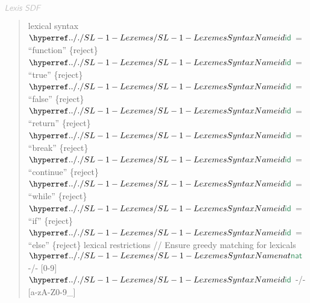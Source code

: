 $\KEY{Lexis SDF}$

\begin{quote}
lexical syntax\newline
   $\SHADE{\SYNHYPER{../.}{SL-1-Lexemes}{id}}$ = {}``function{}'' \{reject\}\newline
   $\SHADE{\SYNHYPER{../.}{SL-1-Lexemes}{id}}$ = {}``true{}''     \{reject\}\newline
   $\SHADE{\SYNHYPER{../.}{SL-1-Lexemes}{id}}$ = {}``false{}''    \{reject\}\newline
   $\SHADE{\SYNHYPER{../.}{SL-1-Lexemes}{id}}$ = {}``return{}''   \{reject\}\newline
   $\SHADE{\SYNHYPER{../.}{SL-1-Lexemes}{id}}$ = {}``break{}''    \{reject\}\newline
   $\SHADE{\SYNHYPER{../.}{SL-1-Lexemes}{id}}$ = {}``continue{}'' \{reject\}\newline
   $\SHADE{\SYNHYPER{../.}{SL-1-Lexemes}{id}}$ = {}``while{}''    \{reject\}\newline
   $\SHADE{\SYNHYPER{../.}{SL-1-Lexemes}{id}}$ = {}``if{}''       \{reject\}\newline
   $\SHADE{\SYNHYPER{../.}{SL-1-Lexemes}{id}}$ = {}``else{}''     \{reject\}\newline
   \newline
   lexical restrictions\newline
   // Ensure greedy matching for lexicals\newline
   $\SHADE{\SYNHYPER{../.}{SL-1-Lexemes}{nat}}$ -/- {[}0-9{]}\newline
   $\SHADE{\SYNHYPER{../.}{SL-1-Lexemes}{id}}$  -/- {[}a-zA-Z0-9\_{]}
\end{quote}



